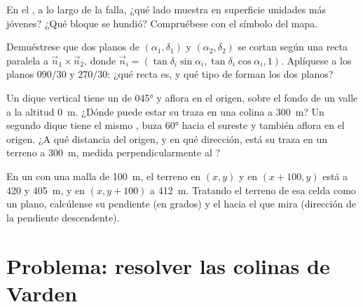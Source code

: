 \begin{exercise}[$\star\star$]\label{exo:b1:geological-maps:9}
En el , a lo largo de la falla, ¿qué lado muestra en superficie unidades más jóvenes?
¿Qué bloque se hundió? Compruébese con el símbolo del mapa.
\end{exercise}

\begin{exercise}[$\star\star\star$]\label{exo:b1:geological-maps:10}
Demuéstrese que dos planos de  $(\alpha_1, \delta_1)$ y $(\alpha_2, \delta_2)$ se cortan según
una recta paralela a $\vec n_1 \times \vec n_2$, donde $\vec n_i = (\tan\delta_i\sin\alpha_i,
\tan\delta_i\cos\alpha_i, 1)$. Aplíquese a los planos $090/30$ y $270/30$: ¿qué recta es, y qué tipo
de  forman los dos planos?
\end{exercise}

\begin{exercise}[$\star\star\star$]\label{exo:b1:geological-maps:11}
Un dique vertical tiene un  de \ang{045} y aflora en el origen, sobre el fondo de un valle a la
altitud \qty{0}{m}. ¿Dónde puede estar su traza en una colina a \qty{300}{m}? Un segundo dique tiene
el mismo , buza \ang{60} hacia el sureste y también aflora en el origen. ¿A qué distancia del
origen, y en qué dirección, está su traza en un terreno a \qty{300}{m}, medida perpendicularmente al
?
\end{exercise}

\begin{exercise}[$\star\star\star$]\label{exo:b1:geological-maps:12}
En un  con una malla de \qty{100}{m}, el terreno en $(x, y)$ y en
$(x + 100, y)$ está a 420 y \qty{405}{m}, y en $(x, y + 100)$ a \qty{412}{m}. Tratando el terreno de
esa celda como un plano, calcúlense su pendiente (en grados) y el  hacia el que mira
(dirección de la pendiente descendente).
\end{exercise}

\section{Problema: resolver las colinas de Varden}

